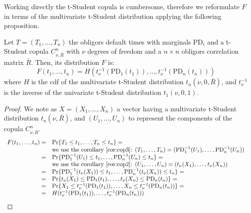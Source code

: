 \documentclass[11pt,fleqn]{book} %
\begin{document}
Working directly the t-Student copula is cumbersome, therefore we 
reformulate $F$ in terms of the multivariate t-Student distribution 
applying the following proposition.

\begin{proposition}
	\label{prop:dtd}
	Let $T=(T_1,\dots,T_n)$ the obligors default times with marginals 
	$\text{PD}_i$ and a t-Student copula $C_{\nu,\bar{R}}^n$ with $\nu$
	degrees of freedom and a $n {\times} n$ obligors correlation matrix 
	$\bar{R}$. Then, its distribution $F$ is:
	\begin{displaymath}
		F(t_1,\dots,t_n) = H\left(t_\nu^{-1}(\text{PD}_1(t_1)), \dots, t_\nu^{-1}(\text{PD}_n(t_n))\right)
	\end{displaymath}
	where $H$ is the cdf of the multivariate t-Student distribution 
	$t_n(\nu,0,\bar{R})$, and $t_\nu^{-1}$ is the inverse of the univariate 
	t-Student distribution $t_1(\nu,0,1)$.
\end{proposition}
\begin{proof}
	We note as $X=(X_1,\dots,X_n)$ a vector having a multivariate t-Student
	distribution $t_n(\nu,\bar{R})$, and $(U_1,\dots,U_n)$ to represent
	the components of the copula $C_{\nu,\bar{R}}^n$.
	\begin{displaymath}
		\begin{array}{rl}
			F(t_1,\dots,t_n) = & \Pr\{ T_1 \le t_1 , \dots, T_n \le t_n \} =                                    \\
			                   & \text{we use the corollary \ref{cor:cop3}: }                                   
			(T_1,\dots,T_n) = (\text{PD}_1^{-1}(U_1),\dots,\text{PD}_n^{-1}(U_n)) \\
			=                  & \Pr\{ \text{PD}_1^{-1}(U_1) \le t_1 , \dots , \text{PD}_n^{-1}(U_n) \le t_n \} =               \\
			                   & \text{we use the corollary \ref{cor:cop2}: }                                   
			(U_1,\dots,U_n) = (t_\nu(X_1),\dots,t_\nu(X_n)) \\
			=                  & \Pr\{ \text{PD}_1^{-1}(t_\nu(X_1)) \le t_1 , \dots , \text{PD}_n^{-1}(t_\nu(X_n)) \le t_n \} = \\
			=                  & \Pr\{ t_\nu(X_1) \le \text{PD}_1(t_1) , \dots , t_\nu(X_n) \le \text{PD}_n(t_n) \} =           \\
			=                  & \Pr\{ X_1 \le t_\nu^{-1}(\text{PD}_1(t_1)) , \dots , X_n \le t_\nu^{-1}(\text{PD}_n(t_n)) \} = \\
			=                  & H(t_\nu^{-1}(\text{PD}_1(t_1)), \dots, t_\nu^{-1}(\text{PD}_n(t_n)))                           \\
		\end{array}
	\end{displaymath}
\end{proof}
\end{document}
